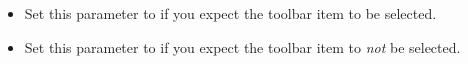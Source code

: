 
\begin{itemize}
\item Set this parameter to \gdrefbooleantrue{} if you expect the toolbar item to be  selected.
\item Set this parameter to \gdrefbooleanfalse{} if you expect the toolbar item to \emph{not} be selected.
\end{itemize}

